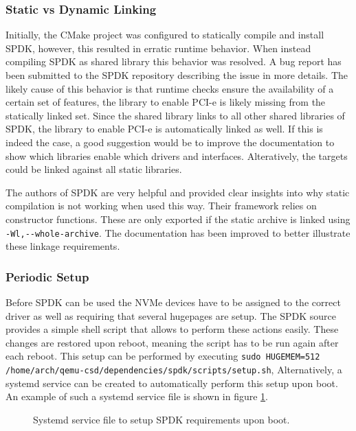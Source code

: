 \documentclass[conference]{IEEEtran}
\newcommand\bashstyle{
	\lstset{
		language=Bash,
		basicstyle=\ttm,
		showstringspaces=false,
		tabsize=2,
		aboveskip=0.2cm,
		belowskip=0.2cm,
		prebreak=\textbackslash,
		extendedchars=true,
		mathescape=false,
		linewidth=8.85cm,
		breaklines=true
	}
}
\newcommand\bashinline[1]{{\bashstyle\lstinline!#1!}}
\newcommand\bashexternal[2][]{{\bashstyle}}
\begin{document}

\subsubsection{Static vs Dynamic Linking}

Initially, the CMake project was configured to statically compile and install
SPDK, however, this resulted in erratic runtime behavior. When instead compiling
SPDK as shared library this behavior was resolved. A bug report has been
submitted to the SPDK repository describing the issue in more
details\cite{spdk-bug}. The likely cause of this behavior is that runtime checks
ensure the availability of a certain set of features, the library to enable
PCI-e is likely missing from the statically linked set. Since the shared
library links to all other shared libraries of SPDK, the library to enable
PCI-e is automatically linked as well. If this is indeed the case, a good
suggestion would be to improve the documentation to show which libraries enable
which drivers and interfaces. Alteratively, the targets could be linked against
all static libraries.

The authors of SPDK are very helpful and provided clear insights into why
static compilation is not working when used this way. Their framework relies on
constructor functions. These are only exported if the static archive is linked
using\bashinline{-Wl,--whole-archive}. The documentation has been improved to
better illustrate these linkage requirements\cite{spdk-documentation-patch}.

\subsubsection{Periodic Setup}

Before SPDK can be used the NVMe devices have to be assigned to the correct
driver as well as requiring that several hugepages are setup. The SPDK source
provides a simple shell script that allows to perform these actions easily.
These  changes are restored upon reboot, meaning the script has to be run again
after each reboot. This setup can be performed by
executing\bashinline{sudo HUGEMEM=512 /home/arch/qemu-csd/dependencies/spdk/scripts/setup.sh},
Alternatively, a systemd service can be created to automatically perform this
setup upon boot. An example of such a systemd service file is shown in
figure \ref{fig:spdk-service}.

\begin{center}
	\begin{figure}[H]
		\bashexternal{resources/bash/spdk.service}
		\captionsetup{justification=centering}
		\caption{Systemd service file to setup SPDK requirements upon boot.}
		\label{fig:spdk-service}
	\end{figure}
\end{center}
\end{document}
